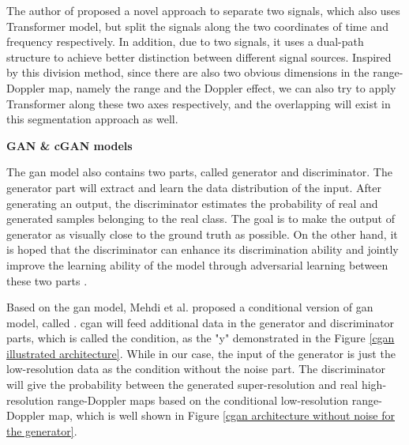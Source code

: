 The author of \cite{hinderer_blind_2022} proposed a novel approach to separate two signals, which also uses Transformer model, but split the signals along the two coordinates of time and frequency respectively. In addition, due to two signals, it uses a dual-path structure to achieve better distinction between different signal sources. Inspired by this division method, since there are also two obvious dimensions in the range-Doppler map, namely the range and the Doppler effect, we can also try to apply Transformer along these two axes respectively, and the overlapping will exist in this segmentation approach as well.

\begin{spacing}{1.5}
\textbf{\large{GAN \& cGAN models}}
\end{spacing}

The \gls{gan} model also contains two parts, called generator and discriminator. The generator part will extract and learn the data distribution of the input. After generating an output, the discriminator estimates the probability of real and generated samples belonging to the real class. The goal is to make the output of generator as visually close to the ground truth as possible. On the other hand, it is hoped that the discriminator can enhance its discrimination ability and jointly improve the learning ability of the model through adversarial learning between these two parts \cite{goodfellow_generative_2014}.

Based on the \gls{gan} model, Mehdi et al. proposed a conditional version of \gls{gan} model, called  \cite{mirza_conditional_2014}. \gls{cgan} will feed additional data in the generator and discriminator parts, which is called the condition, as the "y" demonstrated in the Figure \ref{cgan illustrated architecture}. While in our case, the input of the generator is just the low-resolution data as the condition without the noise part. The discriminator will give the probability between the generated super-resolution and real high-resolution range-Doppler maps based on the conditional low-resolution range-Doppler map, which is well shown in Figure \ref{cgan architecture without noise for the generator}.

